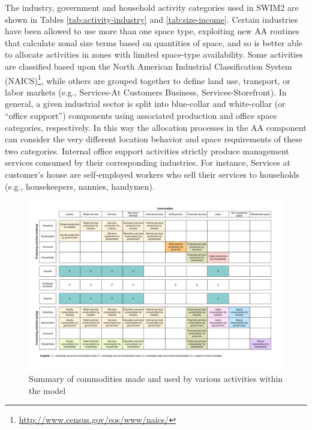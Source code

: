 The industry, government and household activity categories used in SWIM2 are shown in Tables \ref{tab:activity-industry} and \ref{tab:size-income}. Certain industries have been allowed to use more than one space type, exploiting new AA routines that calculate zonal size terms based on quantities of space, and so is better able to allocate activities in zones with limited space-type availability. Some activities are classified based upon the North American Industrial Classification System (NAICS)\footnote{\url{http://www.census.gov/eos/www/naics/}}, while others are grouped together to define land use, transport, or labor markets (e.g., Services-At Customers Business, Services-Storefront). In general, a given industrial sector is split into blue-collar and white-collar (or ``office support'') components using associated production and office space categories, respectively. In this way the allocation processes in the AA component can consider the very different location behavior and space requirements of these two categories. Internal office support activities strictly produce management services consumed by their corresponding industries. For instance, Services at customer's house are self-employed workers who sell their services to households (e.g., housekeepers, nannies, handymen).

\begin{figure}     %
\centering
\includegraphics[scale=0.45]{overview/make-use-summary}
\caption{Summary of commodities made and used by various activities within the model}
\label{fig:make-use-summary}
\end{figure}


